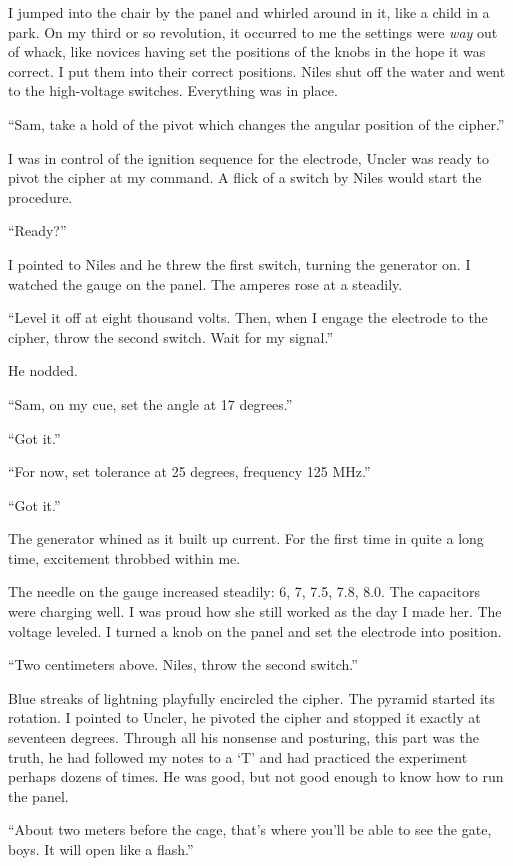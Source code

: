 I jumped into the chair by the panel and whirled around in it, like a
child in a park. On my third or so revolution, it occurred to me the
settings were \emph{way} out of whack, like novices having set the
positions of the knobs in the hope it was correct. I put them into their
correct positions. Niles shut off the water and went to the high-voltage
switches. Everything was in place.

``Sam, take a hold of the pivot which changes the angular position of
the cipher.''

I was in control of the ignition sequence for the electrode, Uncler was
ready to pivot the cipher at my command. A flick of a switch by Niles
would start the procedure.

``Ready?''

I pointed to Niles and he threw the first switch, turning the generator
on. I watched the gauge on the panel. The amperes rose at a steadily.

``Level it off at eight thousand volts. Then, when I engage the
electrode to the cipher, throw the second switch. Wait for my signal.''

He nodded.

``Sam, on my cue, set the angle at 17 degrees.''

``Got it.''

``For now, set tolerance at 25 degrees, frequency 125 MHz.''

``Got it.''

The generator whined as it built up current. For the first time in quite
a long time, excitement throbbed within me.

The needle on the gauge increased steadily: 6, 7, 7.5, 7.8, 8.0. The
capacitors were charging well. I was proud how she still worked as the
day I made her. The voltage leveled. I turned a knob on the panel and
set the electrode into position.

``Two centimeters above. Niles, throw the second switch.''

Blue streaks of lightning playfully encircled the cipher. The pyramid
started its rotation. I pointed to Uncler, he pivoted the cipher and
stopped it exactly at seventeen degrees. Through all his nonsense and
posturing, this part was the truth, he had followed my notes to a `T'
and had practiced the experiment perhaps dozens of times. He was good,
but not good enough to know how to run the panel.

``About two meters before the cage, that's where you'll be able to see
the gate, boys. It will open like a flash.''

